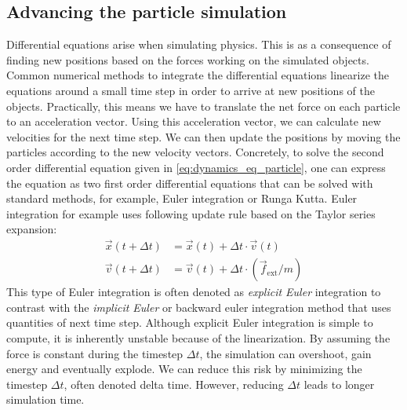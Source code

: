 \documentclass[\home/main.tex]{subfiles}
\begin{document}
\subsection{Advancing the particle simulation}
Differential equations arise when simulating physics. This is as a consequence of finding new positions based on the forces working on the simulated objects. Common numerical methods to integrate the differential equations linearize the equations around a small time step in order to arrive at new positions of the objects.
Practically, this means we have to translate the net force on each particle to an acceleration vector. Using this acceleration vector, we can calculate new velocities for the next time step. We can then update the positions by moving the particles according to the new velocity vectors.
Concretely, to solve the second order differential equation given in \cref{eq:dynamics_eq_particle}, one can express the equation as two first order differential equations that can be solved with standard methods, for example, Euler integration or Runga Kutta. Euler integration for example uses following update rule based on the Taylor series expansion:
\begin{equation}
    \begin{aligned}
        \vec{x}(t+\Delta t) & =\vec{x}(t)+\Delta t \cdot \vec{v}(t)                 \\
        \vec{v}(t+\Delta t) & =\vec{v}(t)+\Delta t \cdot( \vec{f}_{\text{ext}} / m)
    \end{aligned}
\end{equation}
This type of Euler integration is often denoted as \emph{explicit Euler} integration to contrast with the \emph{implicit Euler} or backward euler integration method that uses quantities of next time step.
Although explicit Euler integration is simple to compute, it is inherently unstable because of the linearization. By assuming the force is constant during the timestep $\Delta t$, the simulation can overshoot, gain energy and eventually explode. We can reduce this risk by minimizing the timestep $\Delta t$, often denoted delta time. However, reducing $\Delta t$ leads to longer simulation time.

\end{document}
